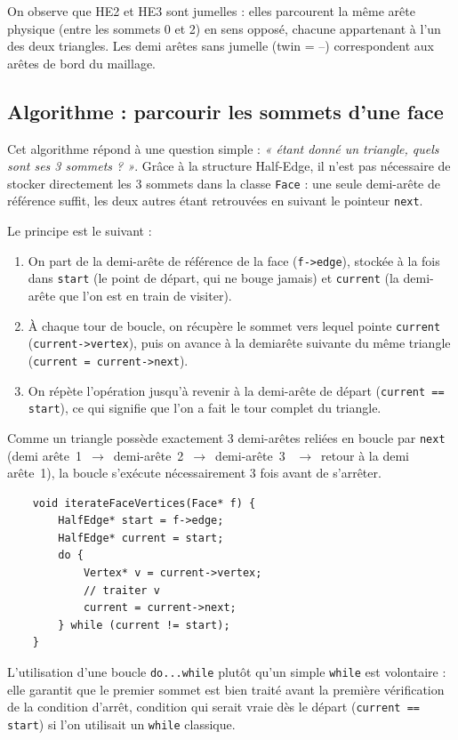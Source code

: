 On observe que HE2 et HE3 sont jumelles : elles parcourent la même
arête physique (entre les sommets 0 et 2) en sens opposé, chacune
appartenant à l'un des deux triangles. Les demi arêtes sans jumelle
(twin = --) correspondent aux arêtes de bord du maillage.

\subsection{Algorithme : parcourir les sommets d'une face}

Cet algorithme répond à une question simple : \emph{« étant donné un
	triangle, quels sont ses 3 sommets ? »}. Grâce à la structure Half-Edge,
il n'est pas nécessaire de stocker directement les 3 sommets dans la
classe \texttt{Face} : une seule demi-arête de référence suffit, les
deux autres étant retrouvées en suivant le pointeur \texttt{next}.

Le principe est le suivant :
\begin{enumerate}
	\item On part de la demi-arête de référence de la face
	(\texttt{f->edge}), stockée à la fois dans \texttt{start} (le
	point de départ, qui ne bouge jamais) et \texttt{current} (la
	demi-arête que l'on est en train de visiter).
	\item À chaque tour de boucle, on récupère le sommet vers lequel
	pointe \texttt{current} (\texttt{current->vertex}), puis on avance
	à la demiarête suivante du même triangle
	(\texttt{current = current->next}).
	\item On répète l'opération jusqu'à revenir à la demi-arête de
	départ (\texttt{current == start}), ce qui signifie que l'on a
	fait le tour complet du triangle.
\end{enumerate}

Comme un triangle possède exactement 3 demi-arêtes reliées en boucle
par \texttt{next} (demi arête~1~$\to$~demi-arête~2~$\to$~demi-arête~3~
$\to$~retour à la demi arête~1), la boucle s'exécute nécessairement
3 fois avant de s'arrêter.

\begin{verbatim}
	void iterateFaceVertices(Face* f) {
		HalfEdge* start = f->edge;
		HalfEdge* current = start;
		do {
			Vertex* v = current->vertex;
			// traiter v
			current = current->next;
		} while (current != start);
	}
\end{verbatim}

L'utilisation d'une boucle \texttt{do...while} plutôt qu'un simple
\texttt{while} est volontaire : elle garantit que le premier sommet
est bien traité avant la première vérification de la condition
d'arrêt, condition qui serait vraie dès le départ
(\texttt{current == start}) si l'on utilisait un \texttt{while}
classique.


